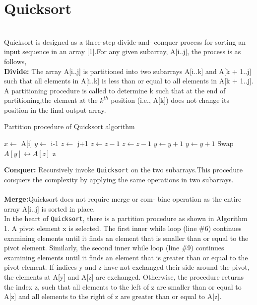 \documentclass[a4paper,10pt,twocolumn]{article}
\begin{document}
\section{Quicksort}~\\
Quicksort is designed as a three-step divide-and-
conquer process for sorting an input sequence in
an array [1].For any given subarray, A[i..j], the
process is as follows,\\
\textbf{Divide:} The array A[i..j] is partitioned into two
subarrays A[i..k] and A[k + 1..j] such that all elements in A[i..k] is less than or equal to all elements
in A[k + 1..j]. A partitioning procedure is called to
determine k such that at the end of partitioning,the element at the $k^{th}$ position (i.e., A[k]) does not change its position in the final output array.
\newpage
\begin{algorithm}
\caption{Partition procedure of Quicksort algorithm}
\begin{algorithmic}[1]
  \newline
 \newline
       \State $x \leftarrow$ A[i]
       \State $y \leftarrow$ i-1
       \State $z \leftarrow$ j+1
           \State $z \leftarrow z-1$
        \State $z \leftarrow z-1$ 
        \EndWhile
        \State $y \leftarrow y+1$ 
        \State $y \leftarrow y+1$
        \EndWhile
        \State Swap $A[y]  \leftrightarrow A[z]$
        \Else
          \State  \Return z
        \EndIf
       \EndWhile
    \EndProcedure
\end{algorithmic}
\end{algorithm}
\noindent \textbf{Conquer:} Recursively invoke \texttt{Quicksort} on the two subarrays.This procedure conquers the complexity by applying the same operations in two subarrays.\\~\\
\textbf{Merge:}Quicksort does not require merge or com- bine operation as the entire array A[i..j] is sorted in place.\\
\indent In the heart of \texttt{Quicksort}, there is a partition procedure as shown in Algorithm 1. A pivot element x is selected. The first inner while loop (line \#6) continues examining elements until it finds an element that is smaller than or equal to the pivot element. Similarly, the second inner while loop (line \#9) continues examining elements until it finds an element that is greater than or equal to the pivot element. If indices y and z have not exchanged their side around the pivot, the elements at A[y] and A[z] are exchanged. Otherwise, the procedure returns the index z, such that all elements to the left of z are smaller than or equal to A[z] and all elements to the right of z are greater than or equal to A[z].\\
\end{document}
